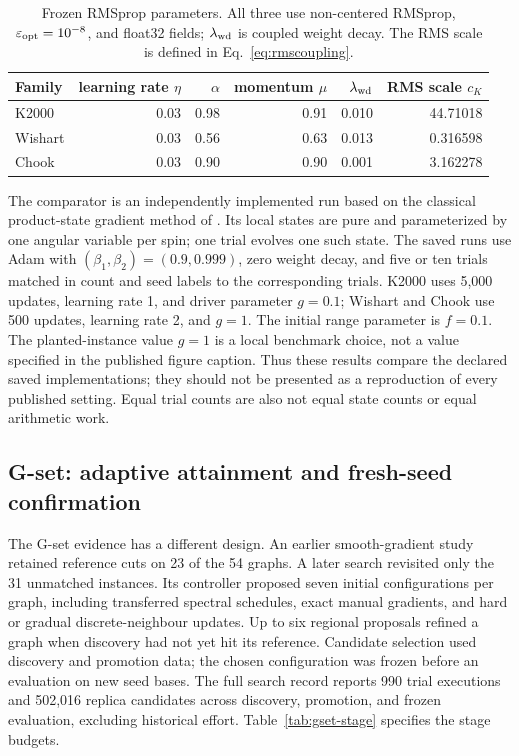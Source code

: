 \begin{table}[t]
\centering\small
\caption{Frozen \QeFEM{} RMSprop parameters. All three use non-centered
RMSprop, $\varepsilon_{\rm opt}=10^{-8}$, and float32 fields; $\lambda_{\rm wd}$
is coupled weight decay. The RMS scale is defined in
Eq.~\eqref{eq:rmscoupling}.}
\label{tab:frozen-optimizer}
\begin{tabular}{lrrrrr}
\toprule
Family & learning rate $\eta$ & $\alpha$ & momentum $\mu$
 & $\lambda_{\rm wd}$ & RMS scale $c_K$\\
\midrule
K2000 & 0.03 & 0.98 & 0.91 & 0.010 & 44.71018\\
Wishart & 0.03 & 0.56 & 0.63 & 0.013 & 0.316598\\
Chook & 0.03 & 0.90 & 0.90 & 0.001 & 3.162278\\
\bottomrule
\end{tabular}
\end{table}

The comparator is an independently implemented \LQA{} run based on the
classical product-state gradient method of \citet{bowles2022}. Its local
states are pure and parameterized by one angular variable per spin;
one trial evolves one such state. The saved runs use Adam with
$(\beta_1,\beta_2)=(0.9,0.999)$, zero weight decay, and five or ten
trials matched in count and seed labels to the corresponding \QeFEM{}
trials. K2000 uses 5,000 updates, learning rate 1, and driver parameter
$g=0.1$; Wishart and Chook use 500 updates, learning rate 2, and $g=1$.
The initial range parameter is $f=0.1$. The planted-instance value $g=1$
is a local benchmark choice, not a value specified in the published
\LQA{} figure caption. Thus these results compare the declared saved
implementations; they should not be presented as a reproduction of every
published \LQA{} setting. Equal trial counts are also not equal state
counts or equal arithmetic work.

\subsection{G-set: adaptive attainment and fresh-seed confirmation}

The G-set evidence has a different design. An earlier smooth-gradient
study retained reference cuts on 23 of the 54 graphs. A later search
revisited only the 31 unmatched instances. Its controller proposed
seven initial configurations per graph, including transferred spectral
schedules, exact manual gradients, and hard or gradual discrete-neighbour
updates. Up to six regional proposals refined a graph when discovery had
not yet hit its reference. Candidate selection used discovery and
promotion data; the chosen configuration was frozen before an evaluation
on new seed bases. The full search record reports 990 trial executions
and 502,016 replica candidates across discovery, promotion, and frozen
evaluation, excluding historical effort. Table~\ref{tab:gset-stage}
specifies the stage budgets.

